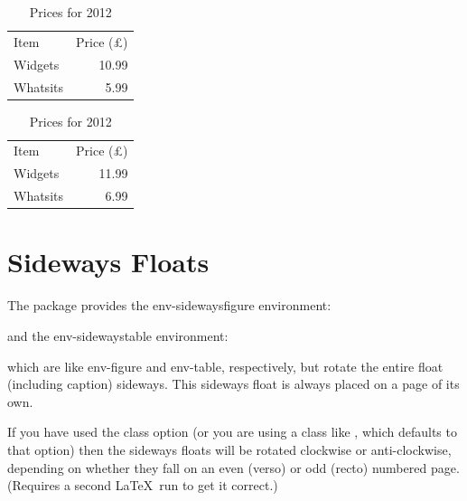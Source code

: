 \begin{table}[htbp]
 \begin{minipage}{0.5\linewidth}
  \caption{Prices for 2011}
  \label{tab:prices2011}
  \centering
  \begin{makeimage}
  \begin{tabular}{lr}
   Item & Price (\pounds)\\
   Widgets & 10.99\\
   Whatsits & 5.99
  \end{tabular}
  \end{makeimage}
 \end{minipage}%
%
 \begin{minipage}{0.5\linewidth}
  \caption{Prices for 2012}
  \label{tab:prices2012}
  \centering
  \begin{makeimage}
  \begin{tabular}{lr}
   Item & Price (\pounds)\\
   Widgets & 11.99\\
   Whatsits & 6.99
  \end{tabular}
  \end{makeimage}
 \end{minipage}%
\end{table}

\section{Sideways Floats}
\label{sec:sidewaysfloats}

The  package provides the \gls{env-sidewaysfigure}
environment:
\begin{definition}
\end{definition}
and the \gls{env-sidewaystable} environment:
\begin{definition}
\end{definition}
which are like \gls{env-figure} and \gls{env-table}, respectively, but rotate the
entire float (including caption) sideways. This sideways float is
always placed on a page of its own.

If you have used the  class option (or you are
using a class like , which defaults to that option)
then the sideways floats will be rotated clockwise or
anti-clockwise, depending on whether they fall on an even (verso) or
odd (recto) numbered page. (Requires a second \LaTeX\ run to get it
correct.) 

